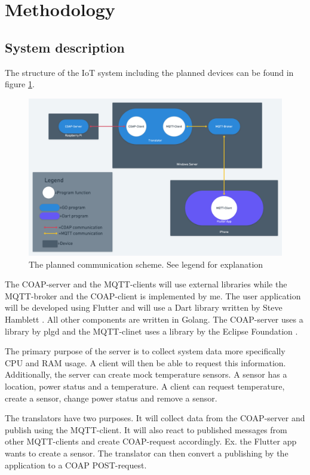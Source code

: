 \section{Methodology}
\label{ch:method}
\noindent	

\subsection{System description}
\label{ch:method:model}
The structure of the IoT system including the planned devices can be found in figure \ref{fig:communication}. 
\begin{figure}[H]
    \centering
    \includegraphics[width=1\textwidth]{img/communication.png} 
    \caption{The planned communication scheme. See legend for explanation}
    \label{fig:communication}
\end{figure}

The COAP-server and the MQTT-clients will use external libraries while the MQTT-broker and the COAP-client is implemented by me. 
The user application will be developed using Flutter and will use a Dart library written by Steve Hamblett \cite{dartMqtt}. 
All other components are written in Golang. The COAP-server uses a library by plgd\cite{goCOAP} and the MQTT-clinet uses a library by the Eclipse Foundation \cite{goMQTT}.

The primary purpose of the server is to collect system data more specifically CPU and RAM usage. A client will then be able to request this information. Additionally, the server can create mock temperature sensors. A sensor has a location, power status and a temperature. A client can request temperature, create a sensor, change power status and remove a sensor. 

The translators have two purposes. It will collect data from the COAP-server and publish using the MQTT-client. It will also react to published messages from other MQTT-clients and create COAP-request accordingly. Ex. the Flutter app wants to create a sensor. The translator can then convert a publishing by the application to a COAP POST-request.

